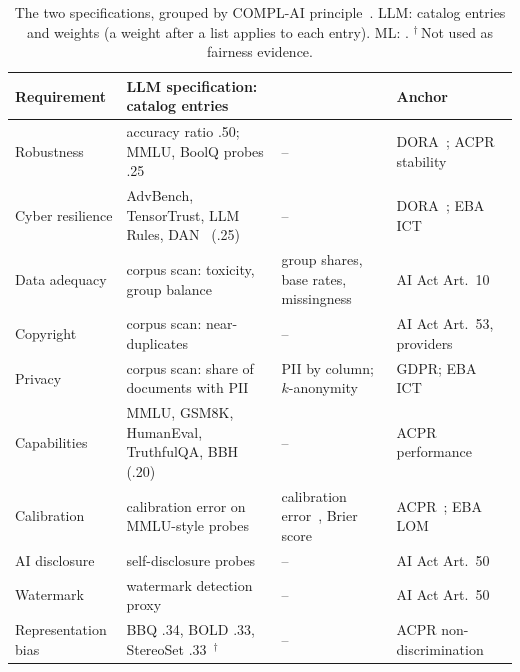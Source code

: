 \begin{table}[t]
  \caption{The two specifications, grouped by COMPL-AI principle~\cite{guldimann2024complai}. LLM: catalog entries and weights (a weight after a list applies to each entry). ML: . $^\dagger$\,Not used as fairness evidence.}
  \label{tab:specs}
  \centering
  \tblsetup
  \begin{tabularx}{\textwidth}{@{}L{2.6cm}XL{4.3cm}L{3.95cm}@{}}
    \toprule
    Requirement & LLM specification: catalog entries &  & Anchor \\
    \midrule
     Robustness & accuracy ratio .50; MMLU, BoolQ probes .25 & -- & DORA~\cite{dora2022}; ACPR stability~\cite{acpr2020ai} \\
     Cyber resilience & AdvBench, TensorTrust, LLM Rules, DAN~\cite{derczynski2024garak} (.25) & -- & DORA~\cite{dora2022}; EBA ICT~\cite{eba2021ictrisk} \\
    \midrule
     Data adequacy & corpus scan: toxicity, group balance & group shares, base rates, missingness\armswitch{}{$^\circ$}{} & AI Act Art.~10~\cite{euaiact2024} \\
     Copyright & corpus scan: near-duplicates & -- & AI Act Art.~53, providers~\cite{euaiact2024} \\
     Privacy & corpus scan: share of documents with PII~\cite{microsoft2023presidio} & PII by column; $k$-anonymity\armswitch{}{$^\circ$}{} & GDPR; EBA ICT~\cite{eba2021ictrisk} \\
    \midrule
     Capabilities & MMLU, GSM8K, HumanEval, TruthfulQA, BBH~\cite{gao2021lmevalharness} (.20) & -- & ACPR performance~\cite{acpr2020ai} \\
     Calibration & calibration error on MMLU-style probes & calibration error~\cite{guo2017calibration}, Brier score & ACPR~\cite{acpr2020ai}; EBA LOM~\cite{eba2020loan} \\
     AI disclosure & self-disclosure probes & -- & AI Act Art.~50~\cite{euaiact2024} \\
     Watermark & watermark detection proxy & -- & AI Act Art.~50~\cite{euaiact2024} \\
    \midrule
     Representation bias & BBQ .34, BOLD .33, StereoSet .33~\cite{parrish2022bbq,dhamala2021bold,nadeem2021stereoset}$^\dagger$ & -- & ACPR non-discrimination~\cite{acpr2020ai} \\

\end{tabularx}
\end{table}
